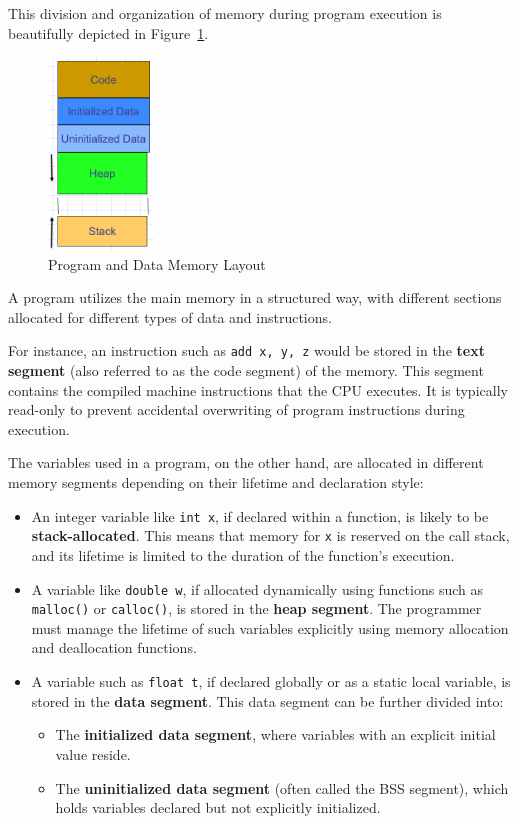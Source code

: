 \documentclass[12pt]{book}
\begin{document}
This division and organization of memory during program execution is beautifully depicted in Figure~\ref{fig:program_data}.

\begin{figure}[ht]
    \centering
    \includegraphics[width=0.25\textwidth]{images/program_data.png}
    \caption{Program and Data Memory Layout}
    \label{fig:program_data}
\end{figure}
A program utilizes the main memory in a structured way, with different sections allocated for different types of data and instructions. 

For instance, an instruction such as \texttt{add x, y, z} would be stored in the \textbf{text segment} (also referred to as the code segment) of the memory. This segment contains the compiled machine instructions that the CPU executes. It is typically read-only to prevent accidental overwriting of program instructions during execution.

The variables used in a program, on the other hand, are allocated in different memory segments depending on their lifetime and declaration style:

\begin{itemize}
    \item An integer variable like \texttt{int x}, if declared within a function, is likely to be \textbf{stack-allocated}. This means that memory for \texttt{x} is reserved on the call stack, and its lifetime is limited to the duration of the function's execution.
    
    \item A variable like \texttt{double w}, if allocated dynamically using functions such as \texttt{malloc()} or \texttt{calloc()}, is stored in the \textbf{heap segment}. The programmer must manage the lifetime of such variables explicitly using memory allocation and deallocation functions.
    
    \item A variable such as \texttt{float t}, if declared globally or as a static local variable, is stored in the \textbf{data segment}. This data segment can be further divided into:
    \begin{itemize}
        \item The \textbf{initialized data segment}, where variables with an explicit initial value reside.
        \item The \textbf{uninitialized data segment} (often called the BSS segment), which holds variables declared but not explicitly initialized.
    \end{itemize}
\end{itemize}
\end{document}
